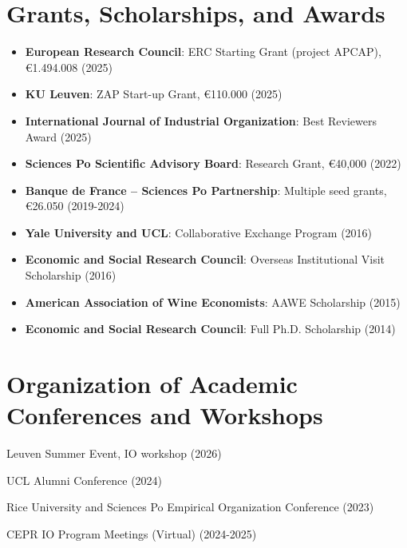 \documentclass[11pt,a4paper]{article}
\begin{document}
\section*{Grants, Scholarships, and Awards}
\begin{itemize}
\renewcommand{\labelitemi}{\fontsize{4}{4}\selectfont$\blacksquare$}
\item \textbf{European Research Council}: ERC Starting Grant (project APCAP), €1.494.008 (2025) \vspace{0.1cm}
\item \textbf{KU Leuven}: ZAP Start-up Grant, €110.000 (2025) \vspace{0.1cm}
\item \textbf{International Journal of Industrial Organization}: Best Reviewers Award (2025) \vspace{0.1cm}
\item \textbf{Sciences Po Scientific Advisory Board}: Research Grant, €40,000 (2022) \vspace{0.1cm}
\item \textbf{Banque de France – Sciences Po Partnership}: Multiple seed grants, €26.050 (2019-2024) \vspace{0.1cm}
\item \textbf{Yale University and UCL}: Collaborative Exchange Program (2016) \vspace{0.1cm}
\item \textbf{Economic and Social Research Council}: Overseas Institutional Visit Scholarship (2016) \vspace{0.1cm}
\item \textbf{American Association of Wine Economists}: AAWE Scholarship (2015) \vspace{0.1cm}
\item \textbf{Economic and Social Research Council}: Full Ph.D. Scholarship (2014) \vspace{0.1cm}
\end{itemize}


\section*{Organization of Academic Conferences and Workshops}
\noindent Leuven Summer Event, IO workshop (2026)

\noindent UCL Alumni Conference (2024)

\noindent Rice University and Sciences Po Empirical Organization Conference (2023)

\noindent CEPR IO Program Meetings (Virtual) (2024-2025)
\end{document}
